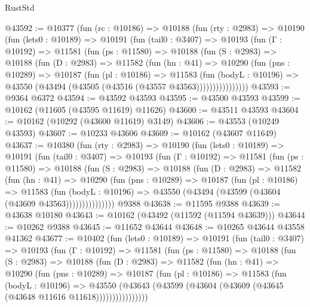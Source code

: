 \begin{lexlean}{RustStd}
\begin{coremodule}
@43592 := @10377
    (fun (rc : @10186) =>
    @10188
      (fun (rty : @2983) =>
      @10190
        (fun (lets0 : @10189) =>
        @10191
          (fun (tail0 : @3407) =>
          @10193
            (fun (Γ : @10192) =>
            @11581
              (fun (ps : @11580) =>
              @10188
                (fun (S : @2983) =>
                @10188
                  (fun (D : @2983) =>
                  @11582
                    (fun (hn : @41) =>
                    @10290
                      (fun (pns : @10289) =>
                      @10187
                        (fun (pl : @10186) =>
                        @11583
                          (fun (bodyL : @10196) =>
                          @43550 (@43494 (@43505 (@43516 (@43557 @43563))))))))))))))))
@43593 := @9364 @6372
@43594 := @43592 @43593
@43595 := @43500 @43593
@43599 := @10162 (@11605 (@43595 @11619) @11626)
@43600 := @43511 @43593
@43604 := @10162 (@10292 (@43600 @11619) @3149)
@43606 := @43553 (@10249 @43593)
@43607 := @10233 @43606
@43609 := @10162 (@43607 @11649)
@43637 := @10380
    (fun (rty : @2983) =>
    @10190
      (fun (lets0 : @10189) =>
      @10191
        (fun (tail0 : @3407) =>
        @10193
          (fun (Γ : @10192) =>
          @11581
            (fun (ps : @11580) =>
            @10188
              (fun (S : @2983) =>
              @10188
                (fun (D : @2983) =>
                @11582
                  (fun (hn : @41) =>
                  @10290
                    (fun (pns : @10289) =>
                    @10187
                      (fun (pl : @10186) =>
                      @11583
                        (fun (bodyL : @10196) =>
                        @43550 (@43494 (@43599 (@43604 (@43609 @43563)))))))))))))))
    @9388
@43638 := @11595 @9388
@43639 := @43638 @10180
@43643 := @10162 (@43492 (@11592 (@11594 @43639)))
@43644 := @10262 @9388
@43645 := @11652 @43644
@43648 := @10265 @43644 @43558 @41362
@43677 := @10402
    (fun (lets0 : @10189) =>
    @10191
      (fun (tail0 : @3407) =>
      @10193
        (fun (Γ : @10192) =>
        @11581
          (fun (ps : @11580) =>
          @10188
            (fun (S : @2983) =>
            @10188
              (fun (D : @2983) =>
              @11582
                (fun (hn : @41) =>
                @10290
                  (fun (pns : @10289) =>
                  @10187
                    (fun (pl : @10186) =>
                    @11583
                      (fun (bodyL : @10196) =>
                      @43550
                        (@43643
                          (@43599 (@43604 (@43609 (@43645 (@43648 @11616 @11618))))))))))))))))

\end{coremodule}
\end{lexlean}
